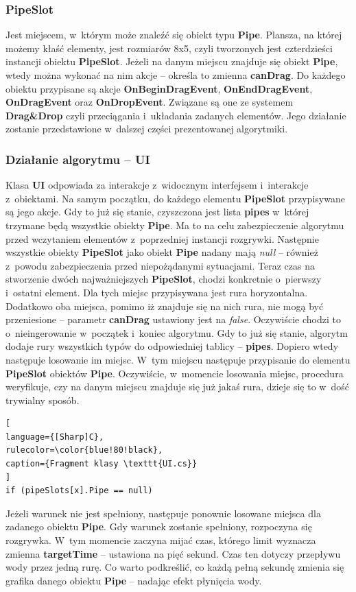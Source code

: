 \documentclass[oneside,polski,logo]{amuthesis}
\begin{document}
\subsubsection{PipeSlot}
\par Jest miejscem, w~którym może znaleźć się obiekt typu \textbf{Pipe}. Plansza, na której możemy kłaść elementy, jest rozmiarów 8x5, czyli tworzonych jest czterdzieści instancji obiektu \textbf{PipeSlot}. Jeżeli na danym miejscu znajduje się obiekt \textbf{Pipe}, wtedy można wykonać na nim akcje – określa to zmienna \textbf{canDrag}. Do każdego obiektu przypisane są akcje \textbf{OnBeginDragEvent}, \textbf{OnEndDragEvent}, \textbf{OnDragEvent} oraz \textbf{OnDropEvent}. Związane są one ze systemem \textbf{Drag\&Drop} czyli przeciągania i~układania zadanych elementów. Jego działanie zostanie przedstawione w~dalszej części prezentowanej algorytmiki.
\subsubsection{Działanie algorytmu – UI}
\par Klasa \textbf{UI} odpowiada za interakcje z~widocznym interfejsem i~interakcje z~obiektami. Na samym początku, do każdego elementu \textbf{PipeSlot} przypisywane są jego akcje. Gdy to już się stanie, czyszczona jest lista \textbf{pipes} w~której trzymane będą wszystkie obiekty \textbf{Pipe}. Ma to na celu zabezpieczenie algorytmu przed wczytaniem elementów z~poprzedniej instancji rozgrywki. Następnie wszystkie obiekty \textbf{PipeSlot} jako obiekt \textbf{Pipe} nadany mają \emph{null} – również z~powodu zabezpieczenia przed niepożądanymi sytuacjami. Teraz czas na stworzenie dwóch najważniejszych \textbf{PipeSlot}, chodzi konkretnie o~pierwszy i~ostatni element. Dla tych miejsc przypisywana jest rura horyzontalna. Dodatkowo oba miejsca, pomimo iż znajduje się na nich rura, nie mogą być przeniesione – parametr \textbf{canDrag} ustawiony jest na \emph{false}. Oczywiście chodzi to o~nieingerowanie w~początek i~koniec algorytmu. Gdy to już się stanie, algorytm dodaje rury wszystkich typów do odpowiedniej tablicy – \textbf{pipes}. Dopiero wtedy następuje losowanie im miejsc. W~tym miejscu następuje przypisanie do elementu \textbf{PipeSlot} obiektów \textbf{Pipe}. Oczywiście, w~momencie losowania miejsc, procedura weryfikuje, czy na danym miejscu znajduje się już jakaś rura, dzieje się to w~dość trywialny sposób.

\begin{lstlisting}[
language={[Sharp]C},
rulecolor=\color{blue!80!black},
caption={Fragment klasy \texttt{UI.cs}}
]
if (pipeSlots[x].Pipe == null)
\end{lstlisting}
Jeżeli warunek nie jest spełniony, następuje ponownie losowane miejsca dla zadanego obiektu \textbf{Pipe}. Gdy warunek zostanie spełniony, rozpoczyna się rozgrywka. W~tym momencie zaczyna mijać czas, którego limit wyznacza zmienna \textbf{targetTime} – ustawiona na pięć sekund. Czas ten dotyczy przepływu wody przez jedną rurę. Co warto podkreślić, co każdą pełną sekundę zmienia się grafika danego obiektu \textbf{Pipe} – nadając efekt płynięcia wody.
\end{document}
